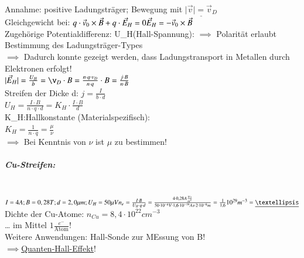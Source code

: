         Annahme: positive Ladungsträger; Bewegung mit $\underline{\vert \vec{v}\vert=\vec{v}_D}$\\
        Gleichgewicht bei: $q\cdot \vec{v}_0\times \vec{B}+q\cdot\vec{E}_H=0\\ \vec{E}_H=-\vec{v}_0\times\vec{B}$\\
        
        Zugehörige Potentialdifferenz: U_H(Hall-Spannung):
        $\implies$ Polarität erlaubt Bestimmung des Ladungsträger-Types\\
        $\implies$ Dadurch konnte gezeigt werden, dass Ladungstransport in Metallen durch Elektronen erfolgt!\\
        
        $\vert \vec{E}_H\vert=\frac{U_H}{b}=\v_D\cdot B=\frac{n\cdot q\cdot v_D}{n\cdot q}\cdot B=\frac{j\cdot B}{n\cdot B}$\\
        
        Streifen der Dicke d: $j=\frac{I}{b\cdot d}$\\
        
        $U_H=\frac{I\cdot B}{n\cdot q\cdot d}=K_H\cdot\frac{I\cdot B}{d}$\\
        
        K_H:Hallkonstante (Materialspezifisch):\\
        $\boxed{K_H=\frac{1}{n\cdot q}=\frac{\mu}{\nu}}$\\
        
        $\implies$ Bei Kenntnis von $\nu$ ist $\mu$ zu bestimmen!
        
        \subparagraph{Cu-Streifen:}\leavevmode \\
        
        $I=4A; B=0,28T; d=2,0\mu m; U_H=50\mu V\\
        n_e=\frac{I\cdot B}{U_H\cdot q\cdot d}=\frac{4\cdot 0,28 A\frac{Vs}{m^2}}{50\cdot 10^{-4}V\cdot 1,6\cdot 10^{-19}As\cdot 2\cdot 10^{-6}m}\\
        =\frac{1}{1,6}10^{29}m^{-3}\\
        =\underline{…}$\\
        
        Dichte der Cu-Atome: $n_{Cu}=8,4\cdot 10^{22}cm^{-3}$\\
        … im Mittel $1\frac{e^-}{\text{Atom}}!$\\
        Weitere Anwendungen: Hall-Sonde zur MEssung von B!\\
        $\implies$\underline{Quanten-Hall-Effekt}!\\
        
